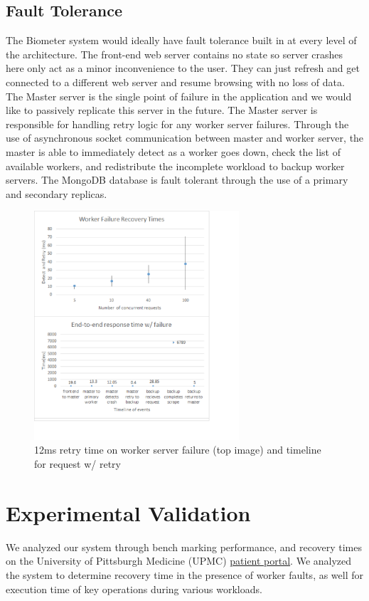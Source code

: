 \documentclass{sig-alternate-nocopyright}
\begin{document}
\subsection{Fault Tolerance} 
The Biometer system would ideally have fault tolerance built in at every level of the architecture. The front-end web server contains no state so server crashes here only act as a minor inconvenience to the user. They can just refresh and get connected to a different web server and resume browsing with no loss of data. The Master server is the single point of failure in the application and we would like to passively replicate this server in the future. The Master server is responsible for handling retry logic for any worker server failures. Through the use of asynchronous socket communication between master and worker server, the master is able to immediately detect as a worker goes down, check the list of available workers, and redistribute the incomplete workload to backup worker servers. The MongoDB database is fault tolerant through the use of a primary and secondary replicas. 
\begin{figure}
\includegraphics[width=3in]{graphs}
\caption{12ms retry time on worker server failure (top image) and timeline for request w/ retry}
\end{figure}
\section{Experimental Validation}
We analyzed our system through bench marking performance, and recovery times on the University of Pittsburgh Medicine (UPMC) \hyperref[https://myupmc.upmc.com]{patient portal}. We analyzed the system to determine recovery time in the presence of worker faults, as well for execution time of key operations during various workloads.
\end{document}
